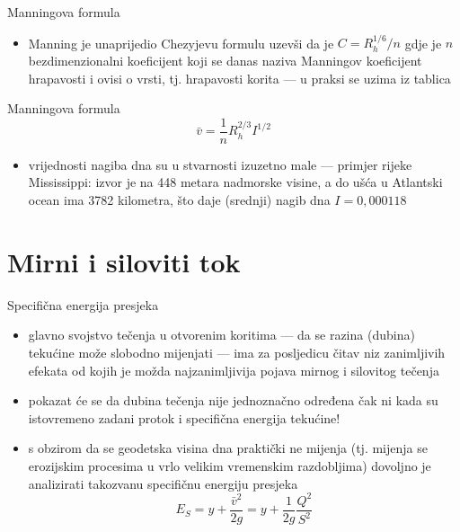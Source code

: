 \documentclass{beamer}
\begin{document}
\begin{frame}{Manningova formula}

\begin{itemize}
\item Manning je unaprijedio Chezyjevu formulu uzevši da je $C=R_{h}^{1/6}/n$
gdje je $n$ bezdimenzionalni koeficijent koji se danas naziva \alert{Manningov koeficijent hrapavosti}
i ovisi o vrsti, tj. hrapavosti korita --- u praksi se uzima iz tablica
\end{itemize}
\begin{alertblock}{Manningova formula}
\[
\bar{v}=\frac{1}{n}R_{h}^{2/3}I^{1/2}
\]
\end{alertblock}
\begin{itemize}
\item vrijednosti nagiba dna su u stvarnosti izuzetno male --- primjer
rijeke Mississippi: izvor je na 448 metara nadmorske visine, a do
ušća u Atlantski ocean ima 3782 kilometra, što daje (srednji) nagib
dna $I=0,000118$
\end{itemize}
\end{frame}

\section{Mirni i siloviti tok}
\begin{frame}{Specifična energija presjeka}

\begin{itemize}
\item glavno svojstvo tečenja u otvorenim koritima --- da se razina (dubina)
tekućine može slobodno mijenjati --- ima za posljedicu čitav niz
zanimljivih efekata od kojih je možda najzanimljivija pojava \alert{mirnog}
i \alert{silovitog} tečenja
\item pokazat će se da dubina tečenja nije jednoznačno određena čak ni kada
su istovremeno zadani protok i specifična energija tekućine!
\item s obzirom da se geodetska visina dna praktički ne mijenja (tj. mijenja
se erozijskim procesima u vrlo velikim vremenskim razdobljima) dovoljno
je analizirati takozvanu \alert{specifičnu energiju presjeka}
\[
E_{S}=y+\frac{\bar{v}^{2}}{2g}=y+\frac{1}{2g}\frac{Q^{2}}{S^{2}}
\]
\end{itemize}
\end{frame}
\end{document}
